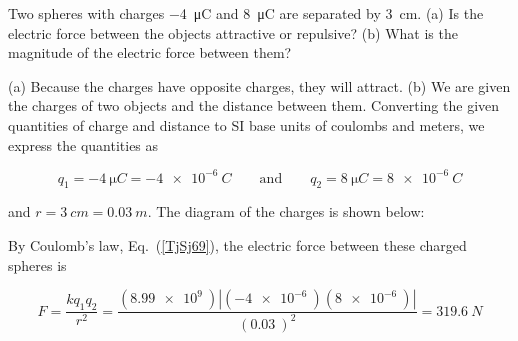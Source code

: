\documentclass[dvipsnames]{article}
\numberwithin{equation}{section}
\numberwithin{figure}{section}
\begin{document}
\begin{example} \label{e3NF5s}
Two spheres with charges \SI{-4}{\micro C} and \SI{8}{\micro C} are separated by \SI{3}{cm}. (a) Is the electric force between the objects attractive or repulsive? (b) What is the magnitude of the electric force between them?
\end{example}

\Solution (a) Because the charges have opposite charges, they will attract. (b) We are given the charges of two objects and the distance between them. Converting the given quantities of charge and distance to SI base units of coulombs and meters, we express the quantities as

\begin{equation*}
    q_1 = \SI{-4}{\micro C} = \SI{-4e-6}{C} 
    \qquad \text{and} \qquad
    q_2 = \SI{8}{\micro C} = \SI{8e-6}{C}
\end{equation*}

and $r = \SI{3}{cm} = \SI{0.03}{m}$. The diagram of the charges is shown below:

\begin{center}
\end{center}

By Coulomb's law, Eq.~(\ref{TjSj69}), the electric force between these charged spheres is

\begin{equation*}
    F = \frac{k q_1 q_2}{r^2} = \frac{\left(\SI{8.99e9}{}\right) \left|\left(\SI{-4e-6}{}\right) \left(\SI{8e-6}{}\right)\right|}{\left(\SI{0.03}{}\right)^2} =
    \SI{319.6}{N}
\end{equation*}
\end{document}
